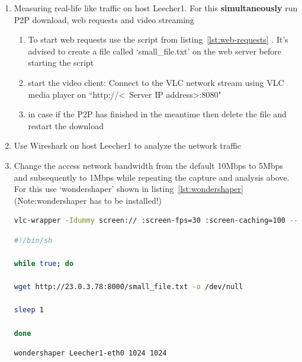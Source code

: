 \documentclass[a4paper]{article}
\begin{document}
\begin{enumerate}
\begin{enumerate}
		\item The video streaming has to be started on host Video using the script from listing~\ref{lst:video-stream} that streams the screen over HTTP on port 8080
	\end{enumerate}
	\item Measuring real-life like traffic on host Leecher1. For this \textbf{simultaneously} run P2P download, web requests and video streaming
	\begin{enumerate}
		\item To start web requests use the script from listing~\ref{lst:web-requests} . It's advised to create a file called `small\_file.txt' on the web server before starting the script
		\item start the video client: Connect to the VLC network stream using VLC media player on ``http://\textless~Server IP address\textgreater:8080"
		\item in case if the P2P has finished in the meantime then delete the file and restart the download
	\end{enumerate}
	\item Use Wireshark on host Leecher1 to analyze the network traffic
	\item Change the access network bandwidth from the default 10Mbps to 5Mbps and subsequently to 1Mbps while repeating the capture and analysis above. For this use `wondershaper' shown in listing~\ref{lst:wondershaper} (Note:wondershaper has to be installed!)



\begin{lstlisting}[language=bash,frame=single,breaklines,caption={VLC streaming server command},label=lst:video-stream]
vlc-wrapper -Idummy screen:// :screen-fps=30 :screen-caching=100 --sout '#transcode{vcodec=mp4v,vb=4096,acodec=mpga,ab=256,scale=1,width=1280,height=800}:http{port=8080,mux=ts}' 
\end{lstlisting}


\begin{lstlisting}[language=bash,frame=single,breaklines,caption={Automatic HTTP download script},label=lst:web-requests]
#!/bin/sh

while true; do

wget http://23.0.3.78:8000/small_file.txt -o /dev/null

sleep 1

done 
\end{lstlisting}


\begin{lstlisting}[language=bash,frame=single,breaklines,caption={Adjusting link capacity},label=lst:wondershaper]
wondershaper Leecher1-eth0 1024 1024 
\end{lstlisting}

\end{enumerate}
\end{document}
